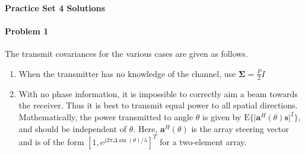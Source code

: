 \documentclass[12pt]{article}
\begin{document}
\begin{center}
\textbf{Practice Set 4 Solutions}
\end{center}
\paragraph{Problem 1} The transmit covariances for the various cases are given as follows.
\begin{enumerate}
\item When the transmitter has no knowledge of the channel, use $\pmb \Sigma=\frac{P}{2}I$
\item With no phase information, it is impossible to correctly aim a beam towards the receiver. Thus it is best to transmit equal power to all spatial directions. Mathematically, the power transmitted to angle $\theta$ is given by 
$\mathrm{E}\{ \lvert \mathbf a^H(\theta) \mathbf s \rvert ^2 \} $, and should be independent of $\theta$. Here, $\mathbf a^H(\theta)$ is the array steering vector and is of the form $[1, e^{j 2\pi \Delta \sin(\theta) / \lambda}]^T$ for a two-element array. 


\end{enumerate}
\end{document}
